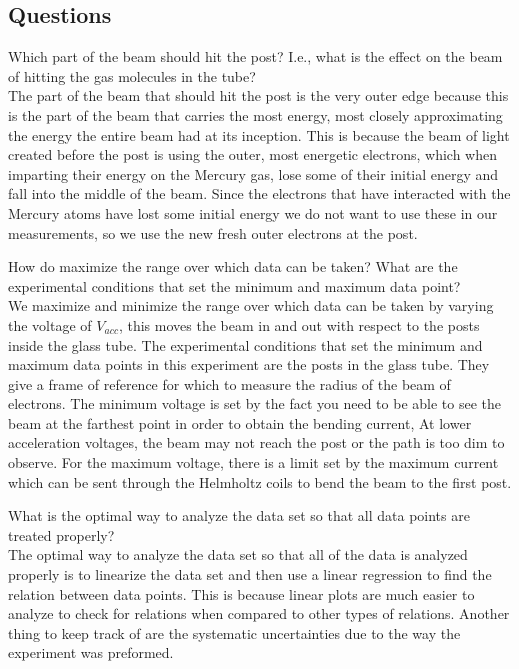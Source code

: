 \documentclass[aps,prl,10pt,twocolumn,floatfix]{revtex4-2}
\begin{document}
\subsection{Questions}
Which part of the beam should hit the post? I.e., what is the effect on the beam of hitting the gas
molecules in the tube?\\
The part of the beam that should hit the post is the very outer edge because this is the part of the beam that carries the most energy, most closely approximating the energy the entire beam had at its inception.
This is because the beam of light created before the post is using the outer, most energetic electrons, which when imparting their energy on the Mercury gas, lose some of their initial energy and fall into the middle of the beam.
Since the electrons that have interacted with the Mercury atoms have lost some initial energy we do not want to use these in our measurements, so we use the new fresh outer electrons at the post.

How do maximize the range over which data can be taken? What are the experimental conditions that
set the minimum and maximum data point?\\
We maximize and minimize the range over which data can be taken by varying the voltage of $V_{acc}$, this moves the beam in and out with respect to the posts inside the glass tube.
The experimental conditions that set the minimum and maximum data points in this experiment are the posts in the glass tube.
They give a frame of reference for which to measure the radius of the beam of electrons.
The minimum voltage is set by the fact you need to be able to see the beam at the farthest point in order to obtain the bending current, At lower acceleration voltages, the beam may not reach the post or the path is too dim to observe. For the maximum voltage, there is a limit set by the maximum current which can be sent through the Helmholtz coils to bend the beam to the first post.

What is the optimal way to analyze the data set so that all data points are treated properly?\\
The optimal way to analyze the data set so that all of the data is analyzed properly is to linearize the data set and then use a linear regression to find the relation between data points.
This is because linear plots are much easier to analyze to check for relations when compared to other types of relations.
Another thing to keep track of are the systematic uncertainties due to the way the experiment was preformed.
\end{document}
